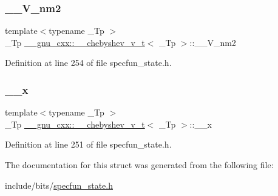 \subsubsection{\texorpdfstring{\+\_\+\+\_\+\+V\+\_\+nm2}{\_\_V\_nm2}}
{\footnotesize\ttfamily template$<$typename \+\_\+\+Tp $>$ \\
\+\_\+\+Tp \hyperlink{struct____gnu__cxx_1_1____chebyshev__v__t}{\+\_\+\+\_\+gnu\+\_\+cxx\+::\+\_\+\+\_\+chebyshev\+\_\+v\+\_\+t}$<$ \+\_\+\+Tp $>$\+::\+\_\+\+\_\+\+V\+\_\+nm2}



Definition at line 254 of file specfun\+\_\+state.\+h.

\mbox{\label{struct____gnu__cxx_1_1____chebyshev__v__t_a58e22482d8e79ded483fa4816e959a5c}} 
\subsubsection{\texorpdfstring{\+\_\+\+\_\+x}{\_\_x}}
{\footnotesize\ttfamily template$<$typename \+\_\+\+Tp $>$ \\
\+\_\+\+Tp \hyperlink{struct____gnu__cxx_1_1____chebyshev__v__t}{\+\_\+\+\_\+gnu\+\_\+cxx\+::\+\_\+\+\_\+chebyshev\+\_\+v\+\_\+t}$<$ \+\_\+\+Tp $>$\+::\+\_\+\+\_\+x}



Definition at line 251 of file specfun\+\_\+state.\+h.



The documentation for this struct was generated from the following file\+:\begin{DoxyCompactItemize}
\item 
include/bits/\hyperlink{specfun__state_8h}{specfun\+\_\+state.\+h}\end{DoxyCompactItemize}
